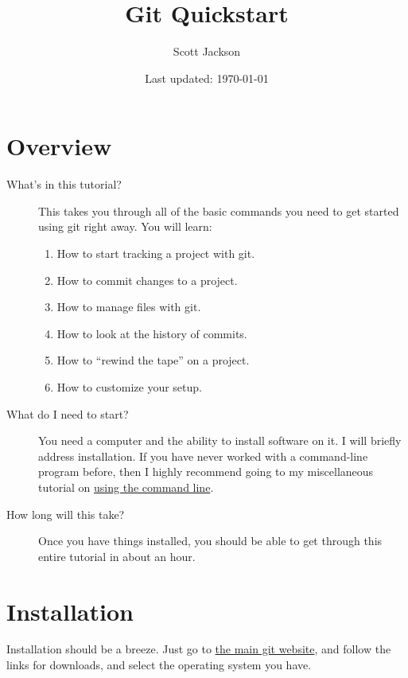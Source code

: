 \documentclass[11pt]{article}
\title{Git Quickstart}
\author{Scott Jackson}
\date{Last updated: \today}
\begin{document}
\maketitle



\section{Overview}
\label{sec-1}

\begin{description}
\item[What's in this tutorial?] This takes you through all of the basic commands you need to get started using git right away. You will learn:
\begin{enumerate}
\item How to start tracking a project with git.
\item How to commit changes to a project.
\item How to manage files with git.
\item How to look at the history of commits.
\item How to ``rewind the tape'' on a project.
\item How to customize your setup.
\end{enumerate}
\item[What do I need to start?] You need a computer and the ability to install software on it. I will briefly address installation.  If you have never worked with a command-line program before, then I highly recommend going to my miscellaneous tutorial on \href{https://github.com/shoestringpsycholing/rrr_tools/misc_tutorials/}{using the command line}.
\item[How long will this take?] Once you have things installed, you should be able to get through this entire tutorial in about an hour.
\end{description}
\section{Installation}
\label{sec-2}

Installation should be a breeze. Just go to \href{http://git-scm.com}{the main git website}, and follow the links for downloads, and select the operating system you have.
\end{document}
